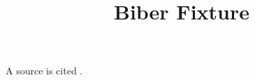 \documentclass{article}
\title{Biber Fixture}
\begin{document}
\maketitle
A source is cited \cite{feynman}.
\printbibliography
\end{document}
